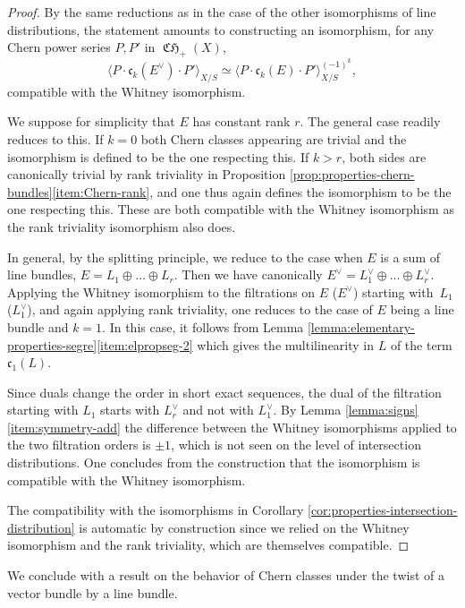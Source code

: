 \documentclass[JEP,XML,SOM,Unicode,published]{cedram}
\theoremstyle{plain}
\theoremstyle{definition}
\newcommand{\cfrak}{\mathfrak c}
\DeclareMathOperator{\CHfrak}{\mathfrak{CH}}
\begin{document}
\begin{proof}
By the same reductions as in the case of the other isomorphisms of line distributions, the statement amounts to constructing an isomorphism, for any Chern power series $P, P'$ in $\CHfrak_+(X)$,
\begin{displaymath}
\langle P \cdot \cfrak_k(E^\vee) \cdot P' \rangle_{X/S} \simeq \langle P \cdot \cfrak_k(E) \cdot P' \rangle_{X/S}^{(-1)^k},
\end{displaymath}
compatible with the Whitney isomorphism.

We suppose for simplicity that $E$ has constant rank $r$. The general case readily reduces to this. If $k = 0$ both Chern classes appearing are trivial and the isomorphism is defined to be the one respecting this. If $k>r$, both sides are canonically trivial by rank triviality in Proposition \ref{prop:properties-chern-bundles}\eqref{item:Chern-rank}, and one thus again defines the isomorphism to be the one respecting this. These are both compatible with the Whitney isomorphism as the rank triviality isomorphism also does.

In general, by the splitting principle, we reduce to the case when $E$ is a sum of line bundles, $E = L_1 \oplus \ldots \oplus L_r$. Then we have canonically $E^\vee = L_1^\vee \oplus \ldots \oplus L_r^\vee$. Applying the Whitney isomorphism to the filtrations on $E$ (\resp $E^\vee$) starting with~$L_1$ (\resp $L_1^\vee$), and again applying rank triviality, one reduces to the case of $E$ being a line bundle and $k = 1$. In this case, it follows from Lemma \ref{lemma:elementary-properties-segre}\eqref{item:elpropseg-2} which gives the multilinearity in $L$ of the term $\cfrak_1(L)$.

Since duals change the order in short exact sequences, the dual of the filtration starting with $L_1$ starts with $L_r^\vee$ and not with $L_1^\vee$. By Lemma \ref{lemma:signs}\eqref{item:symmetry-add} the difference between the Whitney isomorphisms applied to the two filtration orders is $\pm 1$, which is not seen on the level of intersection distributions. One concludes from the construction that the isomorphism is compatible with the Whitney isomorphism.

The compatibility with the isomorphisms in Corollary \ref{cor:properties-intersection-distribution} is automatic by construction since we relied on the Whitney isomorphism and the rank triviality, which are themselves compatible.
\end{proof}

We conclude with a result on the behavior of Chern classes under the twist of a vector bundle by a line bundle.
\end{document}
